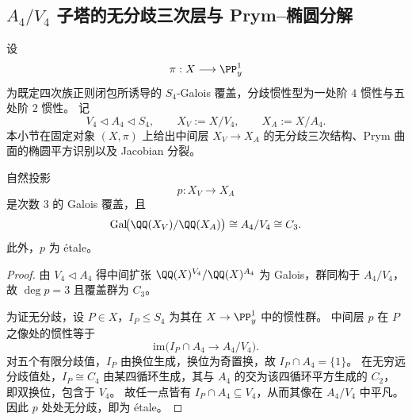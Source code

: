 \subsection{\texorpdfstring{$A_{4}/V_{4}$}{A4/V4} 子塔的无分歧三次层与 Prym--椭圆分解}\label{subsec:cdim-s4-a4-v4-etale-prym-splitting}
设
\[
\pi:X\longrightarrow \PP^1_y
\]
为既定四次族正则闭包所诱导的 \(S_4\)-Galois 覆盖，分歧惯性型为一处阶 \(4\) 惯性与五处阶 \(2\) 惯性。
记
\[
V_{4}\lhd A_{4}\lhd S_{4},\qquad
X_V:=X/V_4,\qquad
X_A:=X/A_4.
\]
本小节在固定对象 \((X,\pi)\) 上给出中间层 \(X_V\to X_A\) 的无分歧三次结构、Prym 曲面的椭圆平方识别以及 Jacobian 分裂。

\begin{conclusion}\label{con:cdim-s4-a4-v4-etale-cubic}
自然投影
\[
p:X_V\longrightarrow X_A
\]
是次数 \(3\) 的 Galois 覆盖，且
\[
\mathrm{Gal}\!\bigl(\QQ(X_V)/\QQ(X_A)\bigr)\cong A_4/V_4\cong C_3.
\]
此外，\(p\) 为 étale。
\end{conclusion}
\begin{proof}
由 \(V_4\lhd A_4\) 得中间扩张 \(\QQ(X)^{V_4}/\QQ(X)^{A_4}\) 为 Galois，群同构于 \(A_4/V_4\)，故 \(\deg p=3\) 且覆盖群为 \(C_3\)。

为证无分歧，设 \(P\in X\)，\(I_P\le S_4\) 为其在 \(X\to\PP^1_y\) 中的惯性群。
中间层 \(p\) 在 \(P\) 之像处的惯性等于
\[
\mathrm{im}\!\bigl(I_P\cap A_4\to A_4/V_4\bigr).
\]
对五个有限分歧值，\(I_P\) 由换位生成，换位为奇置换，故 \(I_P\cap A_4=\{1\}\)。
在无穷远分歧值处，\(I_P\cong C_4\) 由某四循环生成，其与 \(A_4\) 的交为该四循环平方生成的 \(C_2\)，即双换位，包含于 \(V_4\)。
故任一点皆有 \(I_P\cap A_4\subseteq V_4\)，从而其像在 \(A_4/V_4\) 中平凡。
因此 \(p\) 处处无分歧，即为 étale。
\end{proof}

